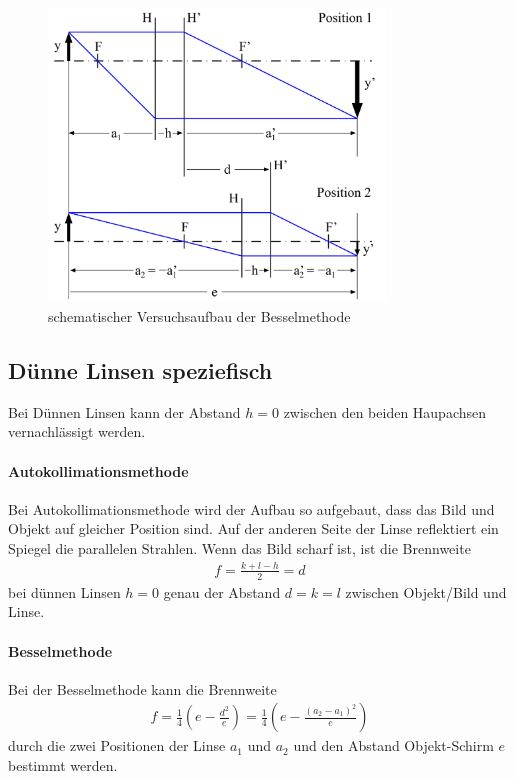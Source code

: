 \documentclass[11pt, a4paper]{article}
\begin{document}
    \begin{figure}
        \centering
        \includegraphics[width=0.8\textwidth]{Bessel_Abb.png}
        \caption{schematischer Versuchsaufbau der Besselmethode \cite{OPA}}   %
        \label{fig:BesselAbb}
    \end{figure}

    \subsection{Dünne Linsen speziefisch}
    Bei Dünnen Linsen kann der Abstand $h = 0$ zwischen den beiden Haupachsen vernachlässigt werden.
    
    \paragraph{Autokollimationsmethode}
    Bei Autokollimationsmethode wird der Aufbau so aufgebaut, dass das Bild und Objekt auf gleicher Position sind. Auf der anderen Seite der Linse reflektiert ein Spiegel die parallelen Strahlen. Wenn das Bild scharf ist, ist die Brennweite
    \begin{align}
        f = \frac{k + l - h}{2}  = d \label{eq:auto}
    \end{align}
    bei dünnen Linsen $h=0$ genau der Abstand $d = k = l$ zwischen Objekt/Bild und Linse.

    \paragraph{Besselmethode}
    Bei der Besselmethode kann die Brennweite
    \begin{align}
        f = \frac{1}{4} \left( e - \frac{d^2}{e} \right) = \frac{1}{4} \left( e - \frac{\left(a_2 - a_1\right)^2}{e} \right) \label{eq:bessel}
    \end{align}
    durch die zwei Positionen der Linse $a_1$ und $a_2$ und den Abstand Objekt-Schirm $e$ bestimmt werden.
    
\end{document}
